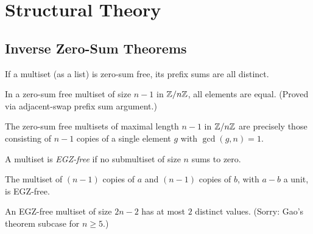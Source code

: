 \chapter{Structural Theory}

\section{Inverse Zero-Sum Theorems}

\begin{theorem}
  \label{thm:prefix_sums_injective}
  \leanok
  If a multiset (as a list) is zero-sum free, its prefix sums are all distinct.
\end{theorem}

\begin{theorem}
  \label{thm:all_eq}
  \leanok
  In a zero-sum free multiset of size $n-1$ in $\mathbb{Z}/n\mathbb{Z}$, all elements
  are equal. (Proved via adjacent-swap prefix sum argument.)
\end{theorem}

\begin{theorem}
  \label{thm:inverse_davenport}
  \leanok
  The zero-sum free multisets of maximal length $n-1$ in $\mathbb{Z}/n\mathbb{Z}$ are
  precisely those consisting of $n-1$ copies of a single element $g$
  with $\gcd(g, n) = 1$.
\end{theorem}

\begin{definition}
  \label{def:egz_free}
  \leanok
  A multiset is \emph{EGZ-free} if no submultiset of size $n$ sums to zero.
\end{definition}

\begin{theorem}
  \label{thm:egz_extremal_free}
  \leanok
  The multiset of $(n-1)$ copies of $a$ and $(n-1)$ copies of $b$,
  with $a - b$ a unit, is EGZ-free.
\end{theorem}

\begin{theorem}
  \label{thm:at_most_two_values}
  An EGZ-free multiset of size $2n-2$ has at most $2$ distinct values.
  (Sorry: Gao's theorem subcase for $n \geq 5$.)
\end{theorem}

